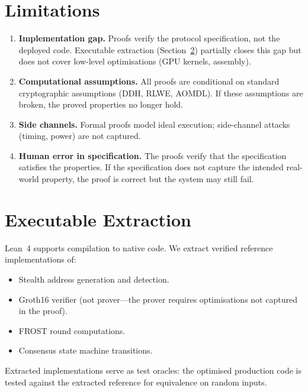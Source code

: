 \documentclass[11pt,a4paper]{article}
\begin{document}
\section{Limitations}
\label{sec:limitations}

\begin{enumerate}
    \item \textbf{Implementation gap.}  Proofs verify the protocol
    specification, not the deployed code.  Executable extraction
    (Section~\ref{sec:extraction}) partially closes this gap but does
    not cover low-level optimisations (GPU kernels, assembly).
    \item \textbf{Computational assumptions.}  All proofs are
    conditional on standard cryptographic assumptions (DDH, RLWE,
    AOMDL).  If these assumptions are broken, the proved properties
    no longer hold.
    \item \textbf{Side channels.}  Formal proofs model ideal execution;
    side-channel attacks (timing, power) are not captured.
    \item \textbf{Human error in specification.}  The proofs verify that
    the specification satisfies the properties.  If the specification
    does not capture the intended real-world property, the proof is
    correct but the system may still fail.
\end{enumerate}

\section{Executable Extraction}
\label{sec:extraction}

Lean~4 supports compilation to native code.  We extract verified
reference implementations of:

\begin{itemize}
    \item Stealth address generation and detection.
    \item Groth16 verifier (not prover---the prover requires
    optimisations not captured in the proof).
    \item FROST round computations.
    \item Consensus state machine transitions.
\end{itemize}

Extracted implementations serve as test oracles: the optimised production
code is tested against the extracted reference for equivalence on random
inputs.
\end{document}

